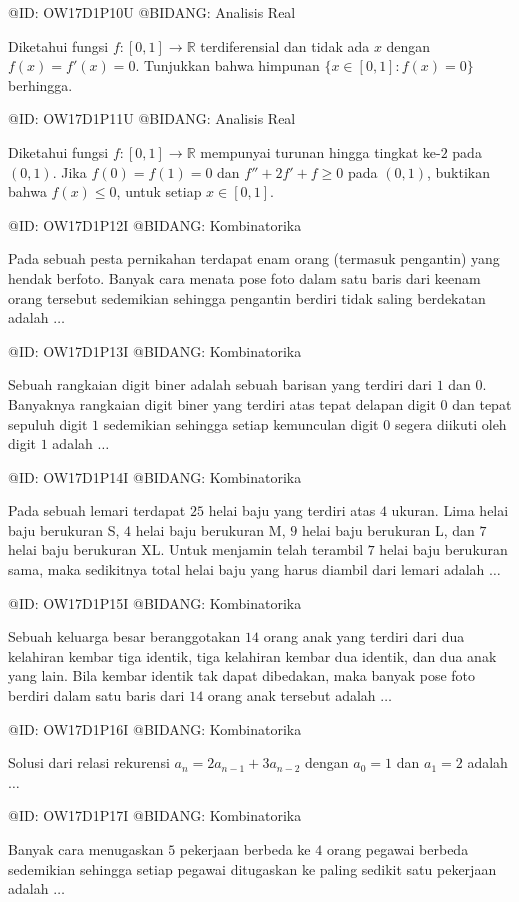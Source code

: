 @ID: OW17D1P10U
@BIDANG: Analisis Real

Diketahui fungsi $f:[0,1]\to\mathbb R$ terdiferensial dan tidak ada $x$ dengan $f(x)=f'(x)=0$. Tunjukkan bahwa himpunan $\{x\in[0,1]:f(x)=0\}$ berhingga.

@ID: OW17D1P11U
@BIDANG: Analisis Real

Diketahui fungsi $f:[0,1]\to\mathbb R$ mempunyai turunan hingga tingkat ke-$2$ pada $(0,1)$. Jika $f(0)=f(1)=0$ dan $f''+2f'+f\geq 0$ pada $(0,1)$, buktikan bahwa $f(x)\leq 0$, untuk setiap $x\in[0,1]$.

@ID: OW17D1P12I
@BIDANG: Kombinatorika

Pada sebuah pesta pernikahan terdapat enam orang (termasuk pengantin) yang hendak berfoto. Banyak cara menata pose foto dalam satu baris dari keenam orang tersebut sedemikian sehingga pengantin berdiri tidak saling berdekatan adalah $\ldots$

@ID: OW17D1P13I
@BIDANG: Kombinatorika

Sebuah rangkaian digit biner adalah sebuah barisan yang terdiri dari $1$ dan $0$. Banyaknya rangkaian digit biner yang terdiri atas tepat delapan digit $0$ dan tepat sepuluh digit $1$ sedemikian sehingga setiap kemunculan digit $0$ segera diikuti oleh digit $1$ adalah $\ldots$

@ID: OW17D1P14I
@BIDANG: Kombinatorika

Pada sebuah lemari terdapat $25$ helai baju yang terdiri atas $4$ ukuran. Lima helai baju berukuran S, $4$ helai baju berukuran M, $9$ helai baju berukuran L, dan $7$ helai baju berukuran XL. Untuk menjamin telah terambil $7$ helai baju berukuran sama, maka sedikitnya total helai baju yang harus diambil dari lemari adalah $\ldots$

@ID: OW17D1P15I
@BIDANG: Kombinatorika

Sebuah keluarga besar beranggotakan $14$ orang anak yang terdiri dari dua kelahiran kembar tiga identik, tiga kelahiran kembar dua identik, dan dua anak yang lain. Bila kembar identik tak dapat dibedakan, maka banyak pose foto berdiri dalam satu baris dari $14$ orang anak tersebut adalah $\ldots$

@ID: OW17D1P16I
@BIDANG: Kombinatorika

Solusi dari relasi rekurensi $a_n=2a_{n-1}+3a_{n-2}$ dengan $a_0=1$ dan $a_1=2$ adalah $\ldots$

@ID: OW17D1P17I
@BIDANG: Kombinatorika

Banyak cara menugaskan $5$ pekerjaan berbeda ke $4$ orang pegawai berbeda sedemikian sehingga setiap pegawai ditugaskan ke paling sedikit satu pekerjaan adalah $\ldots$

